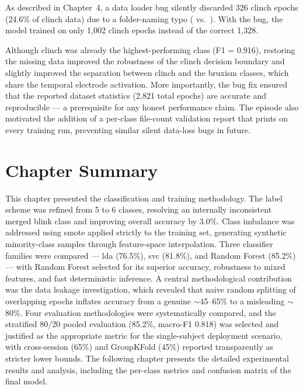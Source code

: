 As described in Chapter~4, a data loader bug silently discarded
326 clinch epochs (24.6\% of clinch data) due to a folder-naming
typo ( vs.\ ). With the bug, the
model trained on only 1{,}002 clinch epochs instead of the correct
1{,}328.

Although clinch was already the highest-performing class (F1 =
0.916), restoring the missing data improved the robustness of the
clinch decision boundary and slightly improved the separation
between clinch and the bruxism classes, which share the temporal
electrode activation. More importantly, the bug fix ensured that
the reported dataset statistics (2{,}821 total epochs) are accurate
and reproducible — a prerequisite for any honest performance claim.
The episode also motivated the addition of a per-class file-count
validation report that prints on every training run, preventing
similar silent data-loss bugs in future.

\section{Chapter Summary}
\label{sec:cl_summary}

This chapter presented the classification and training methodology.
The label scheme was refined from 5 to 6 classes, resolving an
internally inconsistent merged blink class and improving overall
accuracy by 3.0\%. Class imbalance was addressed using
\acrshort{smote} applied strictly to the training set, generating
synthetic minority-class samples through feature-space interpolation.
Three classifier families were compared --- \acrshort{lda} (76.5\%),
\acrshort{svc} (81.8\%), and Random Forest (85.2\%) --- with Random
Forest selected for its superior accuracy, robustness to mixed
features, and fast deterministic inference. A central methodological
contribution was the data leakage investigation, which revealed that
naive random splitting of overlapping epochs inflates accuracy from
a genuine $\sim$45--65\% to a misleading $\sim$80\%. Four evaluation
methodologies were systematically compared, and the stratified
80/20 pooled evaluation (85.2\%, macro-F1 0.818) was selected and
justified as the appropriate metric for the single-subject
deployment scenario, with cross-session (65\%) and GroupKFold (45\%)
reported transparently as stricter lower bounds. The following
chapter presents the detailed experimental results and analysis,
including the per-class metrics and confusion matrix of the final
model.